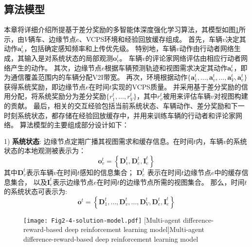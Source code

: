 \subsection{算法模型}
本章将详细介绍所提基于差分奖励的多智能体深度强化学习算法，其模型如图\ref{fig 2-4}所示，由$V$辆车、边缘节点$e$、VCPS环境和经验回放缓存组成。
首先，车辆$v$决定其动作$\boldsymbol{a}_{v}^{t}$，包括确定感知频率和上传优先级。
特别地，车辆$v$动作由行动者网络生成，其输入是对系统状态的局部观测$\boldsymbol{o}_{v}^{t}$。
车辆$v$的评论家网络评估由相应行动者网络产生的动作。
其次，边缘节点$e$根据车辆预测轨迹和视图需求决定其动作$\boldsymbol{a}_{e}^{t}$，即为通信覆盖范围内的车辆分配V2I带宽。
再次，环境根据动作$\{ \boldsymbol{a}_{1}^{t}, \ldots, \boldsymbol{a}_{v}^{t}, \ldots, \boldsymbol{a}_{V}^{t}, \boldsymbol{a}_{e}^{t}\}$ 获得系统奖励，即边缘节点$e$在时间$t$实现的VCPS质量。
并采用基于差分奖励\cite{foerster2018counterfactual}的信用分配，将系统奖励分为差分奖励$\{r_1^t, \ldots, r_{V}^t\}$，其中$r_v^t$被用来评估车辆$v$对视图构建的贡献。
最后，相关的交互经验包括当前系统状态、车辆动作、差分奖励和下一时刻系统状态，都存储在经验回放缓存中，并用来训练车辆的行动者和评论家网络。
算法模型的主要组成部分设计如下：

1) \textbf{系统状态}: 边缘节点定期广播其视图需求和缓存信息。在时间$t$内，车辆$v$的系统状态的本地观测被表示为：
	\begin{equation}
		\boldsymbol{o}_{v}^{t}=\left\{\mathbf{D}_{v}^{t}, \mathbf{D}_{e}^{t}, \mathbf{I}_e^t\right\}
	\end{equation} 
	\noindent 其中$\mathbf{D}_{v}^{t}$表示车辆$v$在时间$t$感知的信息集合；
	$\mathbf{D}_{e}^{t}$ 表示在时间$t$边缘节点$e$中的缓存信息集合，
	以及$\mathbf{I}_e^t$表示边缘节点$e$在时间$t$的边缘节点所需的视图集合。
	那么，时间$t$的系统状态可表示为:
	\begin{equation}
		\boldsymbol{o}^{t}=\left\{\mathbf{D}_{1}^{t}, \ldots, \mathbf{D}_{v}^{t}, \ldots, \mathbf{D}_{V}^{t}, \mathbf{D}_{e}^{t}, \mathbf{I}_{e}^{t}\right\}
	\end{equation}
	
\begin{figure}[t]
\centering
  \texttt{[image: Fig2-4-solution-model.pdf]}
  [Multi-agent difference-reward-based deep reinforcement learning model]{Multi-agent difference-reward-based deep reinforcement learning model}
  \label{fig 2-4}
\end{figure}


